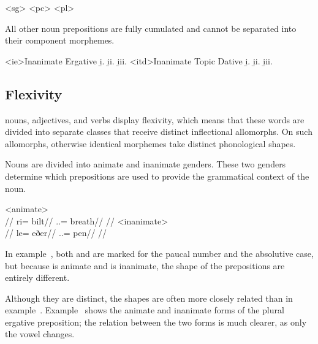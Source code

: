 	\a<sg>  
	\a<pc>  
	\a<pl>  
\xe

All other noun prepositions are fully cumulated and cannot be separated into their component morphemes.

	\a<ie>Inanimate Ergative
	\beginsubsub
		\b{i.}  
		\b{ii.}  
		\b{iii.}  
	\endsubsub
	\a<itd>Inanimate Topic Dative
	\beginsubsub
		\b{i.}  
		\b{ii.}  
		\b{iii.}  
	\endsubsub
\xe


\subsection{Flexivity}
\label{sec:flexivity}

\langtvk{} nouns, adjectives, and verbs display flexivity, which means that these words are divided into separate classes that receive distinct inflectional allomorphs. On such allomorphs, otherwise identical morphemes take distinct phonological shapes.

Nouns are divided into animate and inanimate genders. These two genders determine which prepositions are used to provide the grammatical context of the noun.

	\a<animate>\begingl
		\glpreamble{}\\
		//
		\gla ri= bilt//
		\glb \An.\Pc.\Abs= breath//
		\glft {}//
	\endgl
	\a<inanimate>\begingl
		\glpreamble{}\\
		//
		\gla le= eðer//
		\glb \In.\Pc.\Abs= pen//
		\glft {}//
	\endgl
\xe

In example~, both  and  are marked for the paucal number and the absolutive case, but because  is animate and  is inanimate, the shape of the prepositions are entirely different.

Although they are distinct, the shapes are often more closely related than in example~. Example~ shows the animate and inanimate forms of the plural ergative preposition; the relation between the two forms is much clearer, as only the vowel changes.

